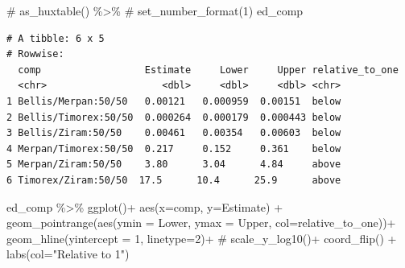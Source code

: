 \documentclass[
  letterpaper,
  DIV=11,
  numbers=noendperiod]{scrreport}
\newenvironment{Shaded}{\begin{snugshade}}{\end{snugshade}}
\newcommand{\AttributeTok}[1]{\textcolor[rgb]{0.40,0.45,0.13}{#1}}
\newcommand{\CommentTok}[1]{\textcolor[rgb]{0.37,0.37,0.37}{#1}}
\newcommand{\DecValTok}[1]{\textcolor[rgb]{0.68,0.00,0.00}{#1}}
\newcommand{\FunctionTok}[1]{\textcolor[rgb]{0.28,0.35,0.67}{#1}}
\newcommand{\NormalTok}[1]{\textcolor[rgb]{0.00,0.23,0.31}{#1}}
\newcommand{\SpecialCharTok}[1]{\textcolor[rgb]{0.37,0.37,0.37}{#1}}
\newcommand{\StringTok}[1]{\textcolor[rgb]{0.13,0.47,0.30}{#1}}
\begin{document}
\begin{Shaded}
\begin{Highlighting}[]
  \CommentTok{\# as\_huxtable() \%\textgreater{}\% }
  \CommentTok{\# set\_number\_format(1)}
\NormalTok{ed\_comp}
\end{Highlighting}
\end{Shaded}

\begin{verbatim}
# A tibble: 6 x 5
# Rowwise: 
  comp                  Estimate     Lower     Upper relative_to_one
  <chr>                    <dbl>     <dbl>     <dbl> <chr>          
1 Bellis/Merpan:50/50   0.00121   0.000959  0.00151  below          
2 Bellis/Timorex:50/50  0.000264  0.000179  0.000443 below          
3 Bellis/Ziram:50/50    0.00461   0.00354   0.00603  below          
4 Merpan/Timorex:50/50  0.217     0.152     0.361    below          
5 Merpan/Ziram:50/50    3.80      3.04      4.84     above          
6 Timorex/Ziram:50/50  17.5      10.4      25.9      above          
\end{verbatim}

\begin{Shaded}
\begin{Highlighting}[]
\NormalTok{ed\_comp }\SpecialCharTok{\%\textgreater{}\%} 
  \FunctionTok{ggplot}\NormalTok{()}\SpecialCharTok{+} 
  \FunctionTok{aes}\NormalTok{(}\AttributeTok{x=}\NormalTok{comp, }\AttributeTok{y=}\NormalTok{Estimate) }\SpecialCharTok{+} 
  \FunctionTok{geom\_pointrange}\NormalTok{(}\FunctionTok{aes}\NormalTok{(}\AttributeTok{ymin =}\NormalTok{ Lower, }\AttributeTok{ymax =}\NormalTok{ Upper, }\AttributeTok{col=}\NormalTok{relative\_to\_one))}\SpecialCharTok{+}     
  \FunctionTok{geom\_hline}\NormalTok{(}\AttributeTok{yintercept =} \DecValTok{1}\NormalTok{, }\AttributeTok{linetype=}\DecValTok{2}\NormalTok{)}\SpecialCharTok{+}
  \CommentTok{\# scale\_y\_log10()+}
  \FunctionTok{coord\_flip}\NormalTok{() }\SpecialCharTok{+} 
  \FunctionTok{labs}\NormalTok{(}\AttributeTok{col=}\StringTok{"Relative to 1"}\NormalTok{)}
\end{Highlighting}
\end{Shaded}
\end{document}
